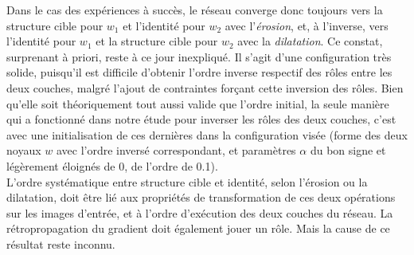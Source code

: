 Dans le cas des expériences à succès, le réseau converge donc toujours vers la structure cible pour $w_1$ et l'identité pour $w_2$ avec l'\textit{érosion}, et, à l'inverse, vers l'identité pour $w_1$ et la structure cible pour $w_2$ avec la \textit{dilatation}. Ce constat, surprenant à priori, reste à ce jour inexpliqué. Il s'agit d'une configuration très solide, puisqu'il est difficile d'obtenir l'ordre inverse respectif des rôles entre les deux couches, malgré l'ajout de contraintes forçant cette inversion des rôles. Bien qu'elle soit théoriquement tout aussi valide que l'ordre initial, la seule manière qui a fonctionné dans notre étude pour inverser les rôles des deux couches, c'est avec une initialisation de ces dernières dans la configuration visée (forme des deux noyaux $w$ avec l'ordre inversé correspondant, et paramètres $\alpha$ du bon signe et légèrement éloignés de 0, de l'ordre de 0.1). \\

\vspace{-1.4mm}
\noindent L'ordre systématique entre structure cible et identité, selon l'érosion ou la dilatation, doit être lié aux propriétés de transformation de ces deux opérations sur les images d'entrée, et à l'ordre d'exécution des deux couches du réseau. La rétropropagation du gradient doit également jouer un rôle. Mais la cause de ce résultat reste inconnu.





